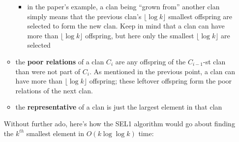 \documentclass[12pt]{article}
\begin{document}
\begin{enumerate}
\begin{itemize}
        \begin{itemize}
            \item in the paper's example, a clan being ``grown from'' another clan simply means that the previous clan's 
            $\lfloor \log k \rfloor$ smallest offspring are selected to form the new clan. Keep in mind that a clan can have 
            more than $\lfloor \log k \rfloor$ offspring, but here only the smallest $\lfloor \log k \rfloor$ are selected
        \end{itemize}

        \item the \textbf{poor relations} of a clan $C_i$ are any offspring of the $C_{i - 1}$-st clan than were not part 
        of $C_i$. As mentioned in the previous point, a clan can have more than $\lfloor \log k \rfloor$ offspring; these 
        leftover offspring form the poor relations of the next clan.

        \item the \textbf{representative} of a clan is just the largest element in that clan
    \end{itemize}

    Without further ado, here's how the SEL1 algorithm would go about finding the $k^{th}$ smallest element in 
    $O(k\log \log k)$ time:
    

\end{enumerate}
\end{document}
